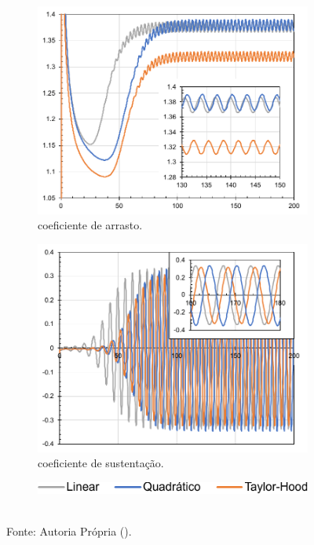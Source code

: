 \begin{figure}[h!]
    \centering
    \caption{Valores ao longo do tempo na simulação LES de:}
    \begin{subfigure}{.49\textwidth}
        \centering
        \includegraphics[width=\linewidth]{Figuras/cylinder/analise2/LES-drag.pdf}
        \caption{coeficiente de arrasto.}
    \end{subfigure}
    \begin{subfigure}{.49\textwidth}
        \centering
        \includegraphics[width=\linewidth]{Figuras/cylinder/analise2/LES-lift.pdf}
        \caption{coeficiente de sustentação.}
    \end{subfigure}
    \begin{subfigure}{\textwidth}
        \centering
        \includegraphics[width=.4\linewidth]{Figuras/cylinder/analise2/legenda.pdf}
    \end{subfigure}
    \\Fonte: Autoria Própria (\the\year).
    \label{fig:cyl-draglift-LES}
\end{figure}

